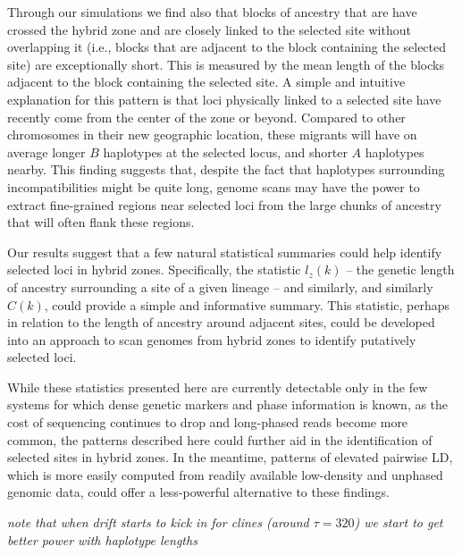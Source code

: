 \documentclass[11pt,letterpaper]{article}
\newcommand{\plr}[1]{{\em \color{blue} #1}}
\begin{document}
Through our simulations we find also that blocks of ancestry that are have crossed the hybrid zone and are closely linked to the selected site without overlapping it (i.e., blocks that are adjacent to the block containing the selected site) are exceptionally short. This is measured by the mean length of the blocks adjacent to the block containing the selected site. A simple and intuitive explanation for this pattern is that loci physically linked to a selected site have recently come from the center of the zone or beyond. Compared to other chromosomes in their new geographic location, these migrants will have on average longer $B$ haplotypes at the selected locus, and shorter $A$ haplotypes nearby. 
This finding suggests that, despite the fact that  haplotypes surrounding incompatibilities might be quite long, genome scans may have the power to extract fine-grained regions near selected loci from the large chunks of ancestry that will often flank these regions. 


Our results suggest that a few natural statistical summaries could help identify selected loci in hybrid zones. 
Specifically, the statistic $l_z(k)$ -- the genetic length of ancestry surrounding a site of a given lineage -- and similarly,  and similarly $C(k)$, could provide a simple and informative summary. 
This statistic, perhaps in relation to the length of ancestry around adjacent sites, could be developed into an approach to scan genomes from hybrid zones to identify putatively selected loci. 

While these statistics presented here are currently detectable only in the few systems for which dense genetic markers and phase information is known, as the cost of sequencing continues to drop and long-phased reads become more common, the patterns described here could further aid in the identification of selected sites in hybrid zones. In the meantime, patterns of elevated pairwise LD, which is more easily computed from readily available low-density and unphased genomic data, could offer a less-powerful alternative to these findings. 


\plr{note that when drift starts to kick in for clines (around $\tau=320$) we start to get better power with haplotype lengths}

\end{document}
